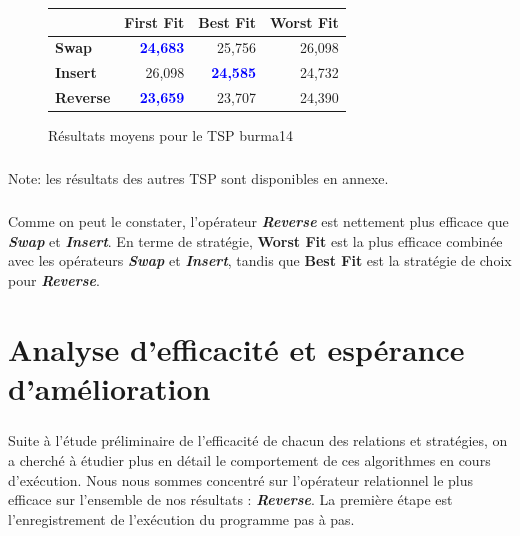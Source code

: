 \documentclass[a4paper,10pt]{report}
\begin{document}
\begin{figure}[ht]
  \begin{center}
    \begin{tabular}{|l|r|r|r|}
      \hline
      &		\textbf{First Fit}&	\textbf{Best Fit}&	\textbf{Worst
Fit}\\\hline
      \textbf{Swap}&
	  \textbf{\textcolor{blue}{24,683}}&
	  25,756&
	  26,098\\\hline
      \textbf{Insert}&
	  26,098&
	  \textbf{\textcolor{blue}{24,585}}&
	  24,732\\\hline
      \textbf{Reverse}&
	  \textbf{\textcolor{blue}{23,659}}&
	  23,707&
	  24,390\\\hline
    \end{tabular}
    \label{burma14-results}
    \caption{Résultats moyens pour le TSP burma14}
  \end{center}
\end{figure}

\paragraph{}
Note: les résultats des autres TSP sont disponibles en annexe.

\paragraph{}
  Comme on peut le constater, l'opérateur \textbf{\textit{Reverse}} est
nettement plus efficace que \textbf{\textit{Swap}} et \textbf{\textit{Insert}}.
En terme de stratégie, \textbf{Worst Fit} est la plus efficace combinée avec les
opérateurs \textbf{\textit{Swap}} et \textbf{\textit{Insert}}, tandis que
\textbf{Best Fit} est la stratégie de choix pour \textbf{\textit{Reverse}}.

\chapter{Analyse d'efficacité et espérance d'amélioration}

\paragraph{}
  Suite à l'étude préliminaire de l'efficacité de chacun des relations et
stratégies, on a cherché à étudier plus en détail le comportement de ces
algorithmes en cours d'exécution. Nous nous sommes concentré sur l'opérateur
relationnel le plus efficace sur l'ensemble de nos résultats :
\textbf{\textit{Reverse}}. La première étape est l'enregistrement de l'exécution
du programme pas à pas.
\end{document}

